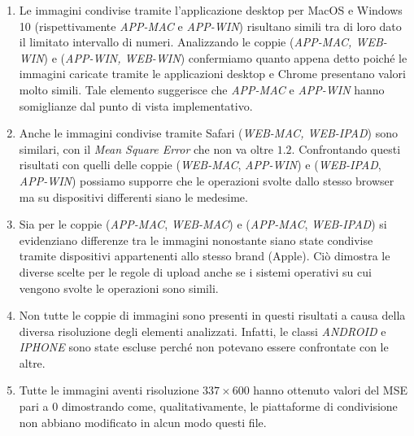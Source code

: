 \begin{enumerate}
    \item Le immagini condivise tramite l'applicazione desktop per MacOS e Windows 10 (rispettivamente \textit{APP-MAC} e \textit{APP-WIN}) risultano simili tra di loro dato il limitato intervallo di numeri. Analizzando le coppie (\textit{APP-MAC, WEB-WIN}) e (\textit{APP-WIN, WEB-WIN}) confermiamo quanto appena detto poiché le immagini caricate tramite le applicazioni desktop e Chrome presentano valori molto simili. Tale elemento suggerisce che \textit{APP-MAC} e \textit{APP-WIN} hanno somiglianze dal punto di vista implementativo.
    
    \item Anche le immagini condivise tramite Safari (\textit{WEB-MAC, WEB-IPAD}) sono similari, con il \textit{Mean Square Error} che non va oltre $1.2$. Confrontando questi risultati con quelli delle coppie (\textit{WEB-MAC}, \textit{APP-WIN}) e (\textit{WEB-IPAD}, \textit{APP-WIN}) possiamo supporre che le operazioni svolte dallo stesso browser ma su dispositivi differenti siano le medesime.
    
    \item Sia per le coppie (\textit{APP-MAC}, \textit{WEB-MAC}) e (\textit{APP-MAC}, \textit{WEB-IPAD}) si evidenziano differenze tra le immagini nonostante siano state condivise tramite dispositivi appartenenti allo stesso brand (Apple). Ciò dimostra le diverse scelte per le regole di upload anche se i sistemi operativi su cui vengono svolte le operazioni sono simili.
    
    \item Non tutte le coppie di immagini sono presenti in questi risultati a causa della diversa risoluzione degli elementi analizzati. Infatti, le classi \textit{ANDROID} e \textit{IPHONE} sono state escluse perché non potevano essere confrontate con le altre.
    
    \item Tutte le immagini aventi risoluzione $337\times600$ hanno ottenuto valori del MSE pari a 0 dimostrando come, qualitativamente, le piattaforme di condivisione non abbiano modificato in alcun modo questi file.
\end{enumerate}

